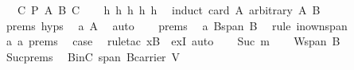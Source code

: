 \begin{isabellebody}
\ \ {\isacharparenleft}\ {\isachardoublequoteopen}{\isasymexists}C{\isachardot}\ {\isacharquery}P\ A\ B\ C{\isachardoublequoteclose}{\isacharparenright}\isanewline
\ \ \isanewline
%
\isadelimproof
%
\endisadelimproof
%
\isatagproof
{}\isamarkupfalse%
\ h{}\ h{}\ h{}\ h{}\ h{}\ \isanewline
{}\isamarkupfalse%
\ {\isacharparenleft}induct\ {\isachardoublequoteopen}card\ A{\isachardoublequoteclose}\ arbitrary{\isacharcolon}\ A\ B{\isacharparenright}\isanewline
\ \ \isamarkupfalse%
\ {}\isanewline
\ \ \isamarkupfalse%
\ {\isachardoublequoteopen}{}{\isachardot}prems{\isachardoublequoteclose}{\isacharparenleft}{}{\isacharparenright}\ {\isachardoublequoteopen}{}{\isachardot}hyps{\isachardoublequoteclose}\ \isamarkupfalse%
\ a{}{\isacharcolon}\ {\isachardoublequoteopen}A{\isacharequal}{\isacharbraceleft}{\isacharbraceright}{\isachardoublequoteclose}\ \isamarkupfalse%
\ auto\isanewline
\ \ \isamarkupfalse%
\ {\isachardoublequoteopen}{}{\isachardot}prems{\isachardoublequoteclose}{\isacharparenleft}{}{\isacharparenright}\ \isamarkupfalse%
\ a{}{\isacharcolon}\ {\isachardoublequoteopen}B{\isasymsubseteq}span\ B{\isachardoublequoteclose}\ \isamarkupfalse%
\ {\isacharparenleft}rule\ in{\isacharunderscore}own{\isacharunderscore}span{\isacharparenright}\isanewline
\ \ \isamarkupfalse%
\ a{}\ a{}\ {\isachardoublequoteopen}{}{\isachardot}prems{\isachardoublequoteclose}\ \isamarkupfalse%
\ {\isacharquery}case\ \isamarkupfalse%
\ {\isacharparenleft}rule{\isacharunderscore}tac\ x{\isacharequal}{\isachardoublequoteopen}B{\isachardoublequoteclose}\ \ exI{\isacharcomma}\ auto{\isacharparenright}\isanewline
{}\isamarkupfalse%
\isanewline
\ \ \isamarkupfalse%
\ {\isacharparenleft}Suc\ m{\isacharparenright}\isanewline
\ \ \isamarkupfalse%
\ {\isacharquery}W{\isacharequal}{\isachardoublequoteopen}span\ B{\isachardoublequoteclose}\isanewline
\ \ \isamarkupfalse%
\ Suc{\isachardot}prems{\isacharparenleft}{}{\isacharparenright}\ \isamarkupfalse%
\ BinC{\isacharcolon}\ {\isachardoublequoteopen}span\ B{\isasymsubseteq}carrier\ V{\isachardoublequoteclose}\ \isamarkupfalse%

\end{isabellebody}
